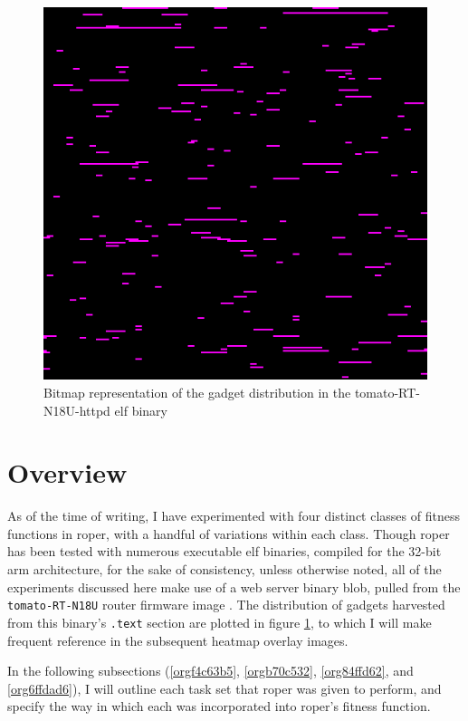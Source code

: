\documentclass[12pt,glossary]{dalthesis}
\begin{document}
\begin{figure}[htbp]
\centering
\includegraphics[width=.9\linewidth]{../images/tomato-RT-N18U-httpd_heatmap.png}
\caption{\label{fig:org3d13c52}
Bitmap representation of the gadget distribution in the tomato-RT-N18U-httpd \gls{elf} binary}
\end{figure}

\section{Overview}
\label{sec:orgc37957e}
\label{org7ce21ac}

As of the time of writing, I have experimented with four distinct classes of
fitness functions in \gls{roper}, with a handful of variations within each class.
Though \gls{roper} has been tested with numerous executable \gls{elf} binaries,
compiled for the 32-bit \gls{arm} architecture, for the sake of consistency, 
unless otherwise noted, all of the experiments discussed here make use of
a web server binary blob, pulled from the \texttt{tomato-RT-N18U} router firmware
image \cite{tomato-RT-N18U}. The distribution of gadgets harvested from this
binary's \texttt{.text} section are plotted in figure \ref{fig:org3d13c52}, to which
I will make frequent reference in the subsequent heatmap overlay images.

In the following subsections (\ref{orgf4c63b5}, \ref{orgb70c532},
\ref{org84ffd62}, and \ref{org6ffdad6}), I will outline each task set that
\gls{roper} was given to perform, and specify the way in which each was
incorporated into \gls{roper}'s fitness function.
\end{document}
